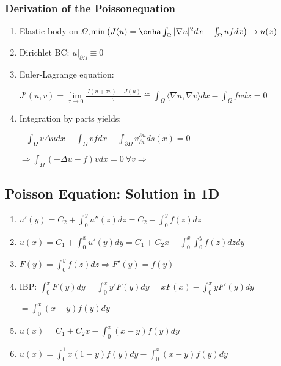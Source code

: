 \documentclass[8pt,a4paper]{scrartcl}
\begin{document}
\begin{multicols*}{3}
\subsubsection*{Derivation of the Poissonequation}

\begin{enumerate}
\ncompaq
\item Elastic body on $\Omega$,$\min\left(J(u)=\onha \int_\Omega |\nabla u|^2dx-\int_\Omega uf dx\right)\rightarrow u(x)$
\item Dirichlet BC: $u|_{\partial \Omega}\equiv 0$
\item Euler-Lagrange equation: 

$J'(u,v)=\lim\limits_{\tau\rightarrow 0}\frac{J(u+\tau v)-J(u)}{\tau}\overset{\ldots}{=}\int_\Omega\langle\nabla u,\nabla v\rangle dx-\int_\Omega fvdx=0$

\item Integration by parts yields: 

$-\int_\Omega v\Delta u dx-\int_\Omega vfdx+\int_{\partial\Omega}v\frac{\partial u}{\partial v}ds(x)=0$


$\Rightarrow \int_\Omega(-\Delta u-f)vdx=0\ \forall v\Rightarrow$ 
\end{enumerate}

\subsection*{Poisson Equation: Solution in 1D}

\begin{enumerate}
\ncompaq
\item $u'(y)=C_2+\int_0^yu''(z)dz=C_2-\int_0^yf(z)dz$
\item $u(x)=C_1+\int_0^xu'(y)dy=C_1+C_2x-\int_0^x\int_0^yf(z)dzdy$
\item $F(y)=\int_0^yf(z)dz\Rightarrow F'(y)=f(y)$
\item IBP: $\int_0^xF(y)dy=\int_0^xy'F(y)dy=xF(x)-\int_0^xyF'(y)dy$

$=\int_0^x(x-y)f(y)dy$
\item $u(x)=C_1+C_2x-\int_0^x(x-y)f(y)dy$
\item $u(x)=\int_0^1x(1-y)f(y)dy-\int_0^x(x-y)f(y)dy$


\end{enumerate}
\end{multicols*}
\end{document}
